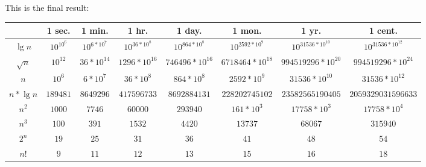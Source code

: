\documentclass{article}
\begin{document}
This is the final result: 

\hskip-2.0cm
\begin{tabular}{ |c|c|c|c|c|c|c|c| }
    \hline
        & 1 sec. & 1 min. & 1 hr. & 1 day. & 1 mon. & 1 yr. & 1 cent. \\
    \hline
    $\lg{n}$ & $10^{10^{6}}$ & $10^{6*10^{7}}$ & $10^{36*10^{8}}$ & $10^{864*10^{8}}$ & $10^{2592*10^{9}}$ & $10^{31536*10^{10}}$ & $10^{31536 * 10^{12}}$\\
    \hline
    $\sqrt{n}$ & $10^{12}$ & $36 * 10^{14}$ & $1296 * 10^{16}$ & $746496 * 10^{16}$ & $6718464 * 10^{18}$ & $994519296 * 10^{20}$ & $994519296 * 10^{24}$\\ 
    \hline
    $n$ & $10^{6}$ & $6*10^{7}$ & $36*10^{8}$ & $864 * 10^{8}$ & $2592 * 10^{9}$ & $31536*10^{10}$ & $31536*10^{12}$\\
    \hline
    $n*\lg{n}$ & $189481$ & $8649296$ & $417596733$ & $8692884131$ & $228202745102$ & $23582565190405$ & $2059329031596633$\\
    \hline
    $n^{2}$ & $1000 $ & $7746$ & $60000$ & $293940$ & $161 * 10^{3}$ & $17758 * 10^{3}$ & $17758 * 10^{4}$\\
    \hline
    $n^{3}$ & $100$ & $391$ & $1532$ & $4420$ & $13737$ & $68067$ & $315940$ \\
    \hline
    $2^{n}$ & $19$ & $25$ & $31$ & $36$ & $41$ & $48$ & $54$\\
    \hline
    $n!$ & $9$ & $11$ & $12$ & $13$ & $15$ & $16$ & $18$\\
    \hline

\end{tabular}
\end{document}
